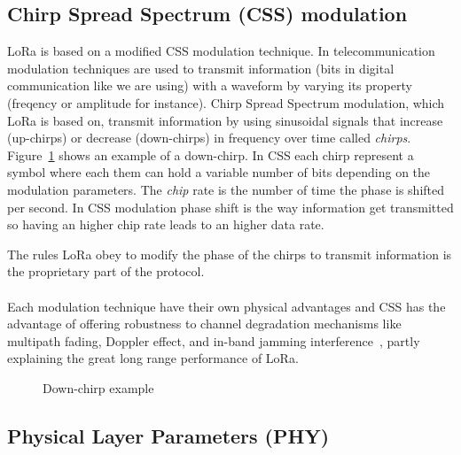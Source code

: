 \subsection{Chirp Spread Spectrum (CSS) modulation}

LoRa is based on a modified CSS modulation technique.
In telecommunication modulation techniques are used to transmit information (bits in digital communication like we are using)
with a waveform by varying its property (freqency or amplitude for instance).
Chirp Spread Spectrum modulation, which LoRa is based on, transmit information
by using sinusoidal signals that increase (up-chirps) or decrease (down-chirps)
in frequency over time called \emph{chirps}.
Figure~\ref{fig:downchirp} shows an example of a down-chirp.
In CSS each chirp represent a symbol where each them can hold a variable number
of bits depending on the modulation parameters.
The \emph{chip} rate is the number of time the phase is shifted per second.
In CSS modulation phase shift is the way information get transmitted so having
an higher chip rate leads to an higher data rate.

The rules LoRa obey to modify the phase of the chirps to transmit information
is the proprietary part of the protocol.

\paragraph{}

Each modulation technique have their own physical advantages and
CSS has the advantage of offering robustness to channel degradation
mechanisms like multipath fading, Doppler effect, and in-band jamming
interference~\cite{semtech:modulationbasics}, partly explaining the great long
range performance of LoRa.

\begin{figure}[H]
\centering
{}
\caption{Down-chirp example\label{fig:downchirp}}
\end{figure}

\subsection{Physical Layer Parameters (PHY)}

